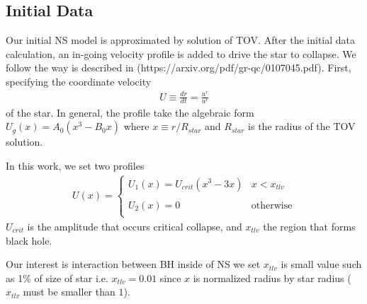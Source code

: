 \documentclass[prd]{revtex4}
\begin{document}

\subsection{Initial Data}
Our initial NS model is approximated by solution of TOV. After the initial data calculation, an in-going velocity profile is added to drive the star to collapse. We follow the way is described in (https://arxiv.org/pdf/gr-qc/0107045.pdf). First, specifying the coordinate velocity
\begin{align}
U \equiv \frac{dr}{dt} = \frac{u^r}{u^r}
\end{align}
of the star. In general, the profile take the algebraic form $U_g(x) = A_0 (x^3 - B_0 x)$ where $x \equiv  r/R_{star}$ and $R_{star}$ is the radius of the TOV solution.

In this work, we set two profiles
\begin{align}
U(x) =
\begin{cases}
U_1(x) = U_{crit} ( x^3 - 3x) & x < x_{tlv} \\
\\
U_2(x) = 0 & \textrm{otherwise} \\
\end{cases}
\end{align}
$U_{crit}$ is the amplitude that occurs critical collapse, and $x_{tlv}$ the region that forms black hole. 

Our interest is interaction between BH inside of NS we set $x_{tlv}$ is small value such as 1\% of size of star i.e. $x_{tlv} = 0.01$ since $x$ is normalized radius by star radius ($x_{tlv}$ must be smaller than $1$).


\end{document}
